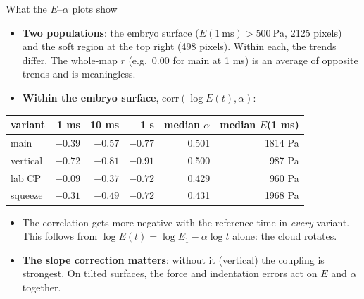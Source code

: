 \documentclass[aspectratio=169,9pt]{beamer}
\begin{document}
\begin{frame}{What the $E$--$\alpha$ plots show}
\small
\begin{itemize}
\item \textbf{Two populations}: the embryo surface ($E(\SI{1}{\milli\second})>\SI{500}{\pascal}$, 2125 pixels) and the soft region at the top right (498 pixels). Within each, the trends differ. The whole-map $r$ (e.g.\ 0.00 for main at 1 ms) is an average of opposite trends and is meaningless.
\item \textbf{Within the embryo surface}, $\mathrm{corr}(\log E(t),\alpha)$:
\end{itemize}
\centering
\begin{tabular}{@{}l r r r | r r@{}}
\toprule
variant & 1 ms & 10 ms & 1 s & median $\alpha$ & median $E$(1 ms)\\
\midrule
main & $-0.39$ & $-0.57$ & $-0.77$ & 0.501 & 1814 Pa\\
vertical & $-0.72$ & $-0.81$ & $-0.91$ & 0.500 & 987 Pa\\
lab CP & $-0.09$ & $-0.37$ & $-0.72$ & 0.429 & 960 Pa\\
squeeze & $-0.31$ & $-0.49$ & $-0.72$ & 0.431 & 1968 Pa\\
\bottomrule
\end{tabular}
\raggedright
\begin{itemize}
\item The correlation gets more negative with the reference time in \emph{every} variant. This follows from $\log E(t)=\log E_1-\alpha\log t$ alone: the cloud rotates.
\item \textbf{The slope correction matters}: without it (vertical) the coupling is strongest. On tilted surfaces, the force and indentation errors act on $E$ and $\alpha$ together.
\end{itemize}
\end{frame}
\end{document}

